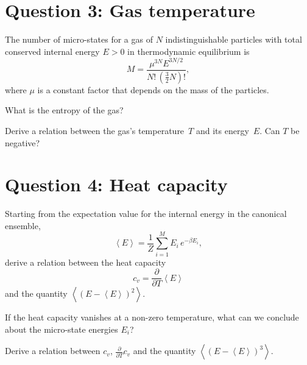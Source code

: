 \documentclass[12 pt]{article} %
\newcommand{\be}{\ensuremath{\beta} }
\newcommand{\vev}[1]{\ensuremath{\left\langle #1 \right\rangle} }
\newcommand{\pderiv}[2]{\ensuremath{\frac{\partial #1}{\partial #2}} }
\newcommand{\showmarks}[1]{\rightline{\texttt{[#1 marks]}}} %
\begin{document}
\showmarks{8}



\vfill
\section*{Question 3: Gas temperature}
The number of micro-states for a gas of $N$ indistinguishable particles with total conserved internal energy $E > 0$ in thermodynamic equilibrium is
\begin{equation*} %
  M = \frac{\mu^{3N} E^{3N / 2}}{N! \, \left(\frac{3}{2}N\right)!},
\end{equation*}
where $\mu$ is a constant factor that depends on the mass of the particles.

What is the entropy of the gas?

\showmarks{8}

Derive a relation between the gas's temperature~$T$ and its energy~$E$.
Can $T$ be negative?

\showmarks{10}



\newpage
\section*{Question 4: Heat capacity}
Starting from the expectation value for the internal energy in the canonical ensemble,
\begin{equation*}
  \vev{E} = \frac{1}{Z} \sum_{i = 1}^M E_i \, e^{-\be E_i},
\end{equation*}
derive a relation between the heat capacity
\begin{equation*}
  c_v = \pderiv{}{T} \vev{E}
\end{equation*}
and the quantity $\vev{\left(E - \vev{E}\right)^2}$.

\showmarks{12}

If the heat capacity vanishes at a non-zero temperature, what can we conclude about the micro-state energies $E_i$?

\showmarks{4}

Derive a relation between $c_v$, $\pderiv{}{T} c_v$ and the quantity $\vev{\left(E - \vev{E}\right)^3}$.

\showmarks{12}



\end{document}
